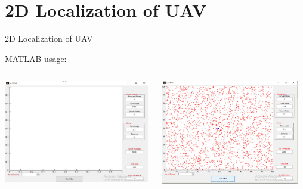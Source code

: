 \section{2D Localization of UAV}

\begin{frame}{2D Localization of UAV}

    MATLAB usage:

    \vfill
    
    \begin{columns}
        \begin{column}{0.45\columnwidth}
            \includegraphics[width=\textwidth]{figures/matlab1.png}
        \end{column}
        \hfill
        \begin{column}{0.45\columnwidth}
            \includegraphics[width=0.95\textwidth]{figures/matlab2.png}
        \end{column}
    \end{columns}

\end{frame}


